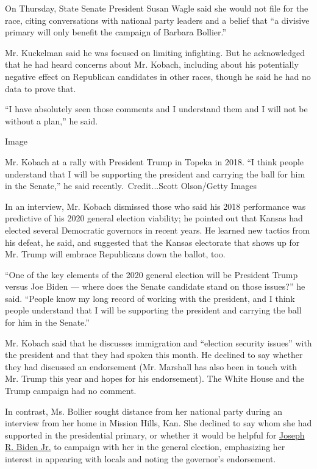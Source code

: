 On Thursday, State Senate President Susan Wagle said she would not file
for the race, citing conversations with national party leaders and a
belief that ``a divisive primary will only benefit the campaign of
Barbara Bollier.''

Mr. Kuckelman said he was focused on limiting infighting. But he
acknowledged that he had heard concerns about Mr. Kobach, including
about his potentially negative effect on Republican candidates in other
races, though he said he had no data to prove that.

``I have absolutely seen those comments and I understand them and I will
not be without a plan,'' he said.

Image

Mr. Kobach at a rally with President Trump in Topeka in 2018. ``I think
people understand that I will be supporting the president and carrying
the ball for him in the Senate,'' he said recently.~Credit...Scott
Olson/Getty Images

In an interview, Mr. Kobach dismissed those who said his 2018
performance was predictive of his 2020 general election viability; he
pointed out that Kansas had elected several Democratic governors in
recent years. He learned new tactics from his defeat, he said, and
suggested that the Kansas electorate that shows up for Mr. Trump will
embrace Republicans down the ballot, too.

``One of the key elements of the 2020 general election will be President
Trump versus Joe Biden --- where does the Senate candidate stand on
those issues?'' he said. ``People know my long record of working with
the president, and I think people understand that I will be supporting
the president and carrying the ball for him in the Senate.''

Mr. Kobach said that he discusses immigration and ``election security
issues'' with the president and that they had spoken this month. He
declined to say whether they had discussed an endorsement (Mr. Marshall
has also been in touch with Mr. Trump this year and hopes for his
endorsement). The White House and the Trump campaign had no comment.

In contrast, Ms. Bollier sought distance from her national party during
an interview from her home in Mission Hills, Kan. She declined to say
whom she had supported in the presidential primary, or whether it would
be helpful for
\href{https://www.nytimes3xbfgragh.onion/interactive/2020/us/elections/joe-biden.html}{Joseph
R. Biden Jr.} to campaign with her in the general election, emphasizing
her interest in appearing with locals and noting the governor's
endorsement.

